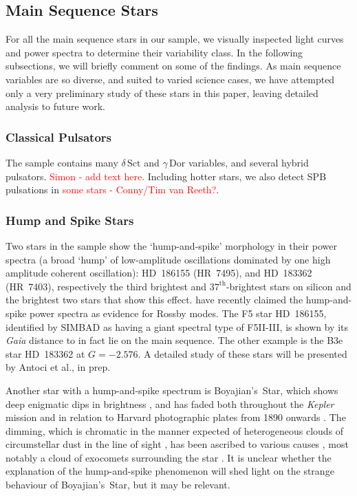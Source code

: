 \documentclass[a4paper,fleqn,usenatbib]{mnras}
\newcommand{\kepler}{\emph{Kepler}\xspace}
\newcommand{\gaia}{\emph{Gaia}\xspace}
\begin{document}
\subsection{Main Sequence Stars}
\label{mainseq}

For all the main sequence stars in our sample, we visually inspected light curves and power spectra to determine their variability class. In the following subsections, we will briefly comment on some of the findings. As main sequence variables are so diverse, and suited to varied science cases, we have attempted only a very preliminary study of these stars in this paper, leaving detailed analysis to future work.

\subsubsection{Classical Pulsators}
\label{pulsators}
The sample contains many $\delta\,\text{Sct}$ and $\gamma\,\text{Dor}$ variables, and several hybrid pulsators. \textcolor{red}{Simon - add text here.}
Including hotter stars, we also detect SPB pulsations in \textcolor{red}{some stars - Conny/Tim van Reeth?}. 

\subsubsection{Hump and Spike Stars}
\label{hs}

Two stars in the sample show the `hump-and-spike' morphology in their power spectra (a broad `hump' of low-amplitude oscillations dominated by one high amplitude coherent oscillation): HD~186155 (HR~7495), and HD~183362 (HR~7403), respectively the third brightest and $37^{\text{th}}$-brightest stars on silicon and the brightest two stars that show this effect. \citet{2018MNRAS.474.2774S} have recently claimed the hump-and-spike power spectra as evidence for Rossby modes. The F5 star HD~186155, identified by SIMBAD as having a giant spectral type of F5II-III, is shown by its \gaia distance to in fact lie on the main sequence. The other example is the B3e star HD~183362 at $G = -2.576$. A detailed study of these stars will be presented by Antoci et al., in prep.

Another star with a hump-and-spike spectrum is Boyajian's~Star, which shows deep enigmatic dips in brightness \citep{2016MNRAS.457.3988B}, and has faded both throughout the \kepler mission \citep{2016ApJ...830L..39M} and in relation to Harvard photographic plates from 1890 onwards \citep{2016ApJ...822L..34S}. The dimming, which is chromatic in the manner expected of heterogeneous clouds of circumstellar dust in the line of sight \citep{2018ApJ...853..130D,2018arXiv180608842B}, has been ascribed to various causes \citep[reviewed in][]{2018RNAAS...2a..16W}, most notably a cloud of exocomets surrounding the star \citep[e.g.][]{2018MNRAS.473.5286W}. It is unclear whether the explanation of the hump-and-spike phenomenon will shed light on the strange behaviour of Boyajian's~Star, but it may be relevant.
\end{document}
